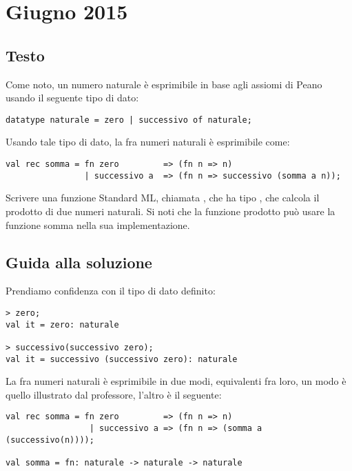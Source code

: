 \section{Giugno 2015}

\subsection{Testo}

Come noto, un numero naturale è esprimibile in base agli assiomi di Peano usando il seguente tipo di dato:

\begin{lstlisting}[style = SML, caption = {Definizione di numero naturale tramite gli Assiomi di Peano}]
datatype naturale = zero | successivo of naturale;
\end{lstlisting}

Usando tale tipo di dato, la  fra numeri naturali è esprimibile come:

\begin{lstlisting}[style = SML, caption = {Definizione della funzione \sml{somma} tramite gli Assiomi di Peano}]
val rec somma = fn zero         => (fn n => n)
				| successivo a	=> (fn n => successivo (somma a n));
\end{lstlisting}

Scrivere una funzione Standard ML, chiamata , che ha tipo , che calcola il prodotto di due numeri naturali. Si noti che la funzione prodotto può usare la funzione somma nella sua implementazione.

\subsection{Guida alla soluzione}

Prendiamo confidenza con il tipo di dato definito:

\begin{lstlisting}[style = SML, caption = {Dichiarazione di numeri naturali}]
> zero;
val it = zero: naturale

> successivo(successivo zero);
val it = successivo (successivo zero): naturale
\end{lstlisting}

La  fra numeri naturali è esprimibile in due modi, equivalenti fra loro, un modo è quello illustrato dal professore, l'altro è il seguente:

\begin{lstlisting}[style = SML, caption = {Definizione \emph{alternativa} della funzione \sml{somma} tramite gli Assiomi di Peano}]
val rec somma = fn zero			=> (fn n => n)
 				 | successivo a => (fn n => (somma a (successivo(n))));

val somma = fn: naturale -> naturale -> naturale
\end{lstlisting}

